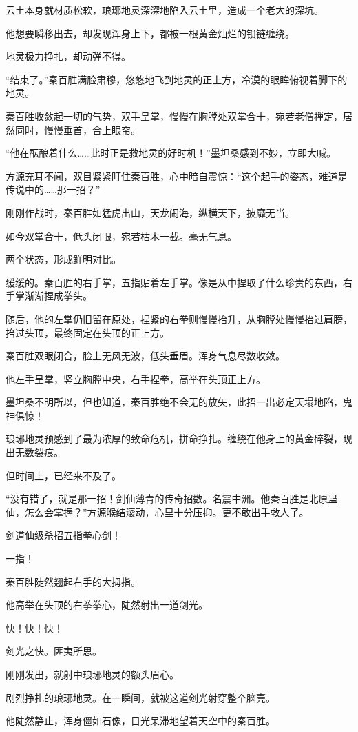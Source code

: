 \begin{this_body}
云土本身就材质松软，琅琊地灵深深地陷入云土里，造成一个老大的深坑。

他想要瞬移出去，却发现浑身上下，都被一根黄金灿烂的锁链缠绕。

地灵极力挣扎，却动弹不得。

“结束了。”秦百胜满脸肃穆，悠悠地飞到地灵的正上方，冷漠的眼眸俯视着脚下的地灵。

秦百胜收敛起一切的气势，双手呈掌，慢慢在胸膛处双掌合十，宛若老僧禅定，居然同时，慢慢垂首，合上眼帘。

“他在酝酿着什么……此时正是救地灵的好时机！”墨坦桑感到不妙，立即大喊。

方源充耳不闻，双目紧紧盯住秦百胜，心中暗自震惊：“这个起手的姿态，难道是传说中的……那一招？”

刚刚作战时，秦百胜如猛虎出山，天龙闹海，纵横天下，披靡无当。

如今双掌合十，低头闭眼，宛若枯木一截。毫无气息。

两个状态，形成鲜明对比。

缓缓的。秦百胜的右手掌，五指贴着左手掌。像是从中捏取了什么珍贵的东西，右手掌渐渐捏成拳头。

随后，他的左掌仍旧留在原处，捏紧的右拳则慢慢抬升，从胸膛处慢慢抬过肩膀，抬过头顶，最终固定在头顶的正上方。

秦百胜双眼闭合，脸上无风无波，低头垂眉。浑身气息尽数收敛。

他左手呈掌，竖立胸膛中央，右手捏拳，高举在头顶正上方。

墨坦桑不明所以，但也知道，秦百胜绝不会无的放矢，此招一出必定天塌地陷，鬼神俱惊！

琅琊地灵预感到了最为浓厚的致命危机，拼命挣扎。缠绕在他身上的黄金碎裂，现出无数裂痕。

但时间上，已经来不及了。

“没有错了，就是那一招！剑仙薄青的传奇招数。名震中洲。他秦百胜是北原蛊仙，怎么会掌握？”方源喉结滚动，心里十分压抑。更不敢出手救人了。

剑道仙级杀招五指拳心剑！

一指！

秦百胜陡然翘起右手的大拇指。

他高举在头顶的右拳拳心，陡然射出一道剑光。

快！快！快！

剑光之快。匪夷所思。

刚刚发出，就射中琅琊地灵的额头眉心。

剧烈挣扎的琅琊地灵。在一瞬间，就被这道剑光射穿整个脑壳。

他陡然静止，浑身僵如石像，目光呆滞地望着天空中的秦百胜。


\end{this_body}
